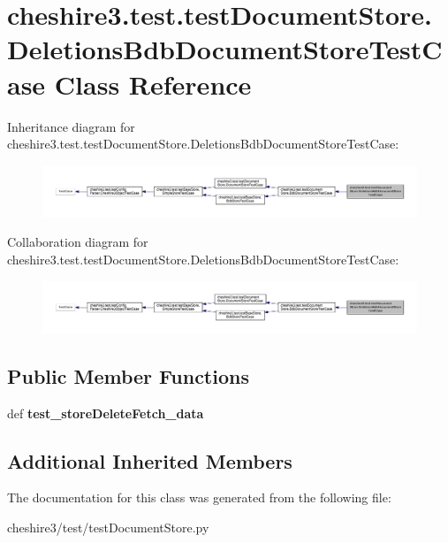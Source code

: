 \hypertarget{classcheshire3_1_1test_1_1test_document_store_1_1_deletions_bdb_document_store_test_case}{\section{cheshire3.\-test.\-test\-Document\-Store.\-Deletions\-Bdb\-Document\-Store\-Test\-Case Class Reference}
\label{classcheshire3_1_1test_1_1test_document_store_1_1_deletions_bdb_document_store_test_case}
}


Inheritance diagram for cheshire3.\-test.\-test\-Document\-Store.\-Deletions\-Bdb\-Document\-Store\-Test\-Case\-:
\nopagebreak
\begin{figure}[H]
\begin{center}
\leavevmode
\includegraphics[width=350pt]{classcheshire3_1_1test_1_1test_document_store_1_1_deletions_bdb_document_store_test_case__inherit__graph}
\end{center}
\end{figure}


Collaboration diagram for cheshire3.\-test.\-test\-Document\-Store.\-Deletions\-Bdb\-Document\-Store\-Test\-Case\-:
\nopagebreak
\begin{figure}[H]
\begin{center}
\leavevmode
\includegraphics[width=350pt]{classcheshire3_1_1test_1_1test_document_store_1_1_deletions_bdb_document_store_test_case__coll__graph}
\end{center}
\end{figure}
\subsection*{Public Member Functions}
\begin{DoxyCompactItemize}
\item 
\hypertarget{classcheshire3_1_1test_1_1test_document_store_1_1_deletions_bdb_document_store_test_case_a343a8ca36a6453e6b109a6c149192c54}{def {\bfseries test\-\_\-store\-Delete\-Fetch\-\_\-data}}\label{classcheshire3_1_1test_1_1test_document_store_1_1_deletions_bdb_document_store_test_case_a343a8ca36a6453e6b109a6c149192c54}

\end{DoxyCompactItemize}
\subsection*{Additional Inherited Members}


The documentation for this class was generated from the following file\-:\begin{DoxyCompactItemize}
\item 
cheshire3/test/test\-Document\-Store.\-py\end{DoxyCompactItemize}
